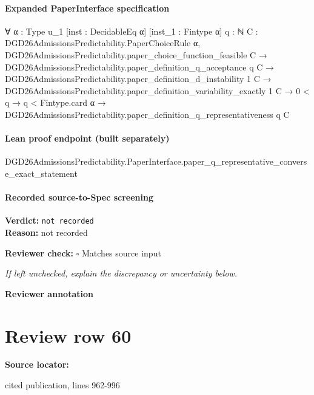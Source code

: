 \documentclass[10pt]{article}
\newcommand{\reviewerbox}{%
  \par\noindent\fbox{\parbox{0.96\linewidth}{\rule{0pt}{0.38in}}}\par
}
\newcommand{\reviewmatch}[1]{%
  \par\noindent\textbf{Reviewer check:} $\square$\; #1\par
  \noindent\emph{If left unchecked, explain the discrepancy or uncertainty below.}\par
}
\begin{document}
\paragraph{Expanded PaperInterface specification}
\begin{ReviewVerbatim}
∀ {α : Type u_1} [inst : DecidableEq α] [inst_1 : Fintype α] {q : ℕ}
  {C : DGD26AdmissionsPredictability.PaperChoiceRule α},
  DGD26AdmissionsPredictability.paper_choice_function_feasible C →
    DGD26AdmissionsPredictability.paper_definition_q_acceptance q C →
      DGD26AdmissionsPredictability.paper_definition_d_instability 1 C →
        DGD26AdmissionsPredictability.paper_definition_variability_exactly 1 C →
          0 < q → q < Fintype.card α → DGD26AdmissionsPredictability.paper_definition_q_representativeness q C
\end{ReviewVerbatim}

\paragraph{Lean proof endpoint (built separately)}\begin{ReviewVerbatim}
DGD26AdmissionsPredictability.PaperInterface.paper_q_representative_converse_exact_statement
\end{ReviewVerbatim}

\paragraph{Recorded source-to-Spec screening}
\textbf{Verdict:} \texttt{not recorded}
\\
\textbf{Reason:} not recorded
\reviewmatch{Matches source input}
\noindent\textbf{Reviewer annotation}\par
\reviewerbox
\clearpage
\hypertarget{source-claim-5fcefe7f9430bc35}{}
\section*{Review row 60}
\textbf{Source locator:} {\footnotesize\raggedright cited publication, lines 962-\allowbreak{}996\par}
\end{document}
